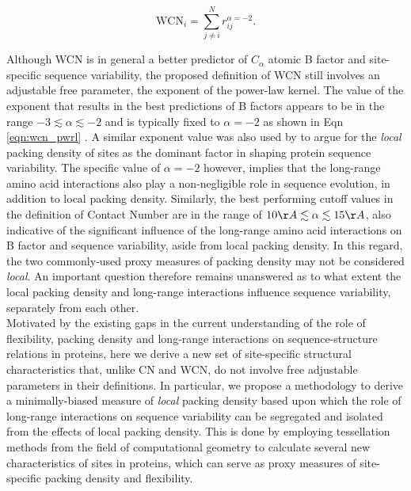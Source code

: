 \documentclass[11pt]{article}
\begin{document}
    \begin{equation}
        \label{eqn:wcn_pwrl}
        \text{WCN}_{i} = \sum^N_{j\neq i} {r_{ij}^{\alpha=-2}}.
    \end{equation}

    Although WCN is in general a better predictor of $C_\alpha$ atomic B factor and site-specific sequence variability, the proposed definition of WCN still involves an adjustable free parameter, the exponent of the power-law kernel. The value of the exponent that results in the best predictions of B factors appears to be in the range $-3\lesssim\alpha\lesssim-2$ and is typically fixed to $\alpha=-2$ as shown in Eqn \ref{eqn:wcn_pwrl} \citep[e.g.,][]{yang_protein_2009}.  A similar exponent value was also used by \citet{huang_mechanistic_2014} to argue for the {\it local} packing density of sites as the dominant factor in shaping protein sequence variability. The specific value of $\alpha=-2$ however, implies that the long-range amino acid interactions also play a non-negligible role in sequence evolution, in addition to local packing density. Similarly, the best performing cutoff values in the definition of Contact Number are in the range of $10\AA\lesssim\alpha\lesssim15\AA$, also indicative of the significant influence of the long-range amino acid interactions on B factor and sequence variability, aside from local packing density. In this regard, the two commonly-used proxy measures of packing density may not be considered {\it local}. An important question therefore remains unanswered as to what extent the local packing density and long-range interactions influence sequence variability, separately from each other. \\

    Motivated by the existing gaps in the current understanding of the role of flexibility, packing density and long-range interactions on sequence-structure relations in proteins, here we derive a new set of site-specific structural characteristics that, unlike CN and WCN, do not involve free adjustable parameters in their definitions. In particular, we propose a methodology to derive a minimally-biased measure of {\it local} packing density based upon which the role of long-range interactions on sequence variability can be segregated and isolated from the effects of local packing density.  This is done by employing tessellation methods from the field of computational geometry to calculate several new characteristics of sites in proteins, which can serve as proxy measures of site-specific packing density and flexibility.
\end{document}
